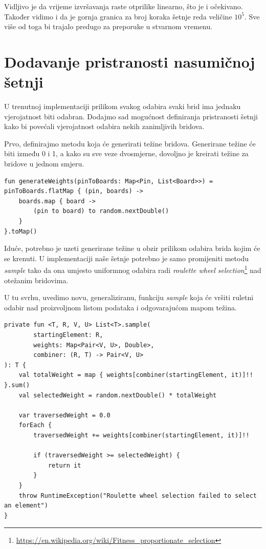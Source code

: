 \documentclass[times, utf8, seminar]{fer}
\begin{document}
Vidljivo je da vrijeme izvršavanja raste otprilike linearno, što je i očekivano. Također vidimo i da je gornja granica za broj koraka šetnje reda veličine $10^5$. Sve više od toga bi trajalo predugo za preporuke u stvarnom vremenu. 

\section{Dodavanje pristranosti nasumičnoj šetnji}

U trenutnoj implementaciji prilikom svakog odabira svaki brid ima jednaku vjerojatnost biti odabran. Dodajmo sad mogućnost definiranja pristranosti šetnji kako bi povećali vjerojatnost odabira nekih zanimljivih bridova.

Prvo, definirajmo metodu koja će generirati težine bridova. Generirane težine će biti između 0 i 1, a kako su sve veze dvosmjerne, dovoljno je kreirati težine za bridove u jednom smjeru.

\begin{lstlisting}
fun generateWeights(pinToBoards: Map<Pin, List<Board>>) = pinToBoards.flatMap { (pin, boards) ->
    boards.map { board ->
        (pin to board) to random.nextDouble()
    }
}.toMap()
\end{lstlisting}

Iduće, potrebno je uzeti generirane težine u obzir prilikom odabira brida kojim će se krenuti. U implementaciji naše šetnje potrebno je samo promijeniti metodu \textit{sample} tako da ona umjesto uniformnog odabira radi \textit{roulette wheel selection}\footnote{\url{https://en.wikipedia.org/wiki/Fitness_proportionate_selection}} nad otežanim bridovima.

U tu svrhu, uvedimo novu, generaliziranu, funkciju \textit{sample} koja će vršiti ruletni odabir nad proizvoljnom listom podataka i odgovarajućom mapom težina.

\begin{lstlisting}
private fun <T, R, V, U> List<T>.sample(
        startingElement: R,
        weights: Map<Pair<V, U>, Double>,
        combiner: (R, T) -> Pair<V, U>
): T {
    val totalWeight = map { weights[combiner(startingElement, it)]!! }.sum()
    val selectedWeight = random.nextDouble() * totalWeight

    var traversedWeight = 0.0
    forEach {
        traversedWeight += weights[combiner(startingElement, it)]!!

        if (traversedWeight >= selectedWeight) {
            return it
        }
    }
    throw RuntimeException("Roulette wheel selection failed to select an element")
}
\end{lstlisting}
\end{document}
